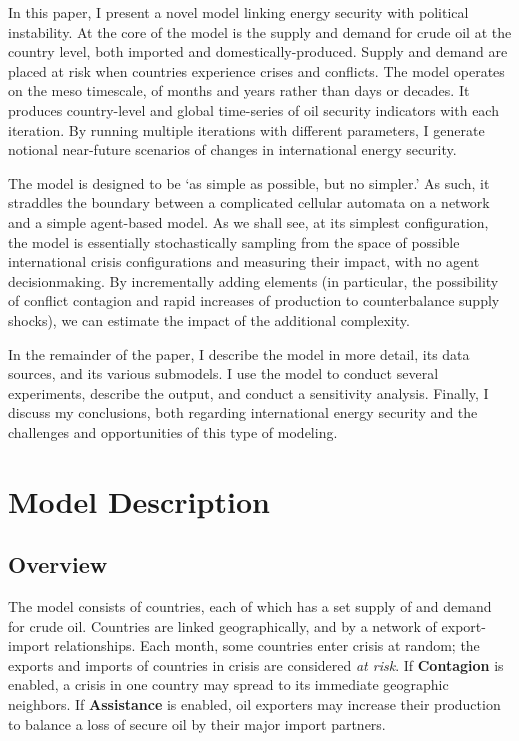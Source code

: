 \documentclass{article}
\begin{document}
In this paper, I present a novel model linking energy security with political instability. At the core of the model is the supply and demand for crude oil at the country level, both imported and domestically-produced. Supply and demand are placed at risk when countries experience crises and conflicts. The model operates on the meso timescale, of months and years rather than days or decades.  It produces country-level and global time-series of oil security indicators with each iteration. By running multiple iterations with different parameters, I generate notional near-future scenarios of changes in international energy security. 

The model is designed to be `as simple as possible, but no simpler.'  As such, it straddles the boundary between a complicated cellular automata on a network and a simple agent-based model. As we shall see, at its simplest configuration, the model is essentially stochastically sampling from the space of possible international crisis configurations and measuring their impact, with no agent decisionmaking. By incrementally adding elements (in particular, the possibility of conflict contagion and rapid increases of production to counterbalance supply shocks), we can estimate the impact of the additional complexity. 

In the remainder of the paper, I describe the model in more detail, its data sources, and its various submodels. I use the model to conduct several experiments, describe the output, and conduct a sensitivity analysis. Finally, I discuss my conclusions, both regarding international energy security and the challenges and opportunities of this type of modeling.

\section{Model Description}

\subsection{Overview}

The model consists of countries, each of which has a set supply of and demand for crude oil. Countries are linked geographically, and by a network of export-import relationships. Each month, some countries enter crisis at random; the exports and imports of countries in crisis are considered \emph{at risk}. If \textbf{Contagion} is enabled, a crisis in one country may spread to its immediate geographic neighbors. If \textbf{Assistance} is enabled, oil exporters may increase their production to balance a loss of secure oil by their major import partners.
\end{document}
